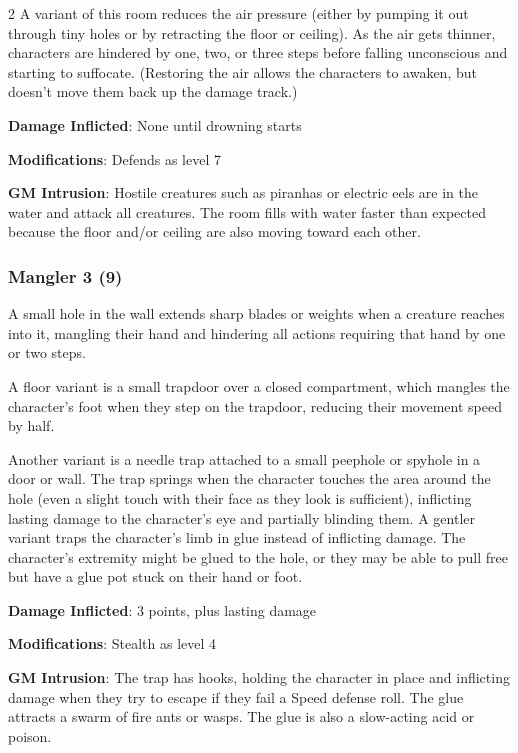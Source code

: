 \begin{multicols}{2}
A variant of this room reduces the air pressure (either by pumping it out through tiny holes or by retracting the floor or ceiling). As the air gets thinner, characters are hindered by one, two, or three steps before falling unconscious and starting to suffocate. (Restoring the air allows the characters to awaken, but doesn’t move them back up the damage track.) 

\textbf{Damage Inflicted}: None until drowning starts 

\textbf{Modifications}: Defends as level 7 

\textbf{GM Intrusion}: Hostile creatures such as piranhas or electric eels are in the water and attack all creatures. The room fills with water faster than expected because the floor and/or ceiling are also moving toward each other.

\subsubsection{Mangler 3 (9)}

A small hole in the wall extends sharp blades or weights when a creature reaches into it, mangling their hand and hindering all actions requiring that hand by one or two steps. 

A floor variant is a small trapdoor over a closed compartment, which mangles the character’s foot when they step on the trapdoor, reducing their movement speed by half.

Another variant is a needle trap attached to a small peephole or spyhole in a door or wall. The trap springs when the character touches the area around the hole (even a slight touch with their face as they look is sufficient), inflicting lasting damage to the character’s eye and partially blinding them. A gentler variant traps the character’s limb in glue instead of inflicting damage. The character’s extremity might be glued to the hole, or they may be able to pull free but have a glue pot stuck on their hand or foot. 

\textbf{Damage Inflicted}: 3 points, plus lasting damage 

\textbf{Modifications}: Stealth as level 4 

\textbf{GM Intrusion}: The trap has hooks, holding the character in place and inflicting damage when they try to escape if they fail a Speed defense roll. The glue attracts a swarm of fire ants or wasps. The glue is also a slow-acting acid or poison.


\end{multicols}
